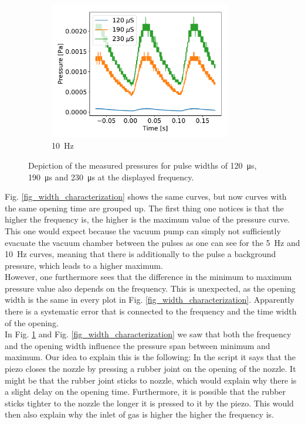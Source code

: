 \documentclass[a4paper,10pt]{article}
\begin{document}
\begin{figure}[H]
\begin{subfigure}[t]{0.45 \textwidth}
    \centering
    \includegraphics[height=6cm]{part1_10_hertz.pdf}
    \caption{\SI{10}{\hertz}}
  \end{subfigure}
  \caption{Depiction of the measured pressures for pulse widths of \SI{120}{\micro \s}, \SI{190}{\micro \s} and \SI{230}{\micro \s} at the displayed frequency. }
  \label{fig_pressure_characterization}
\end{figure}\newpage
Fig. \ref{fig_width_characterization} shows the same curves, but now curves with the same opening time are grouped up. The first thing one notices is that the higher the frequency is, the higher is the maximum value of the pressure curve. This one would expect because the vacuum pump can simply not sufficiently evacuate the vacuum chamber between the pulses as one can see for the \SI{5}{\hertz} and \SI{10}{\hertz} curves, meaning that there is additionally to the pulse a background pressure, which leads to a higher maximum. 
\\
However, one furthermore sees that the difference in the minimum to maximum pressure value also depends on the frequency. This is unexpected, as the opening width is the same in every plot in Fig. \ref{fig_width_characterization}. Apparently there is a systematic error that is connected to the frequency and the time width of the opening. %
\\
In Fig. \ref{fig_pressure_characterization} and Fig. \ref{fig_width_characterization} we saw that both the frequency and the opening width influence the pressure span between minimum and maximum. Our idea to explain this is the following: In the script \cite{script} it says that the piezo closes the nozzle by pressing a rubber joint on the opening of the nozzle. It might be that the rubber joint sticks to nozzle, which would explain why there is a slight delay on the opening time. Furthermore, it is possible that the rubber sticks tighter to the nozzle the longer it is pressed to it by the piezo. This would then also explain why the inlet of gas is higher the higher the frequency is. 
\end{document}
